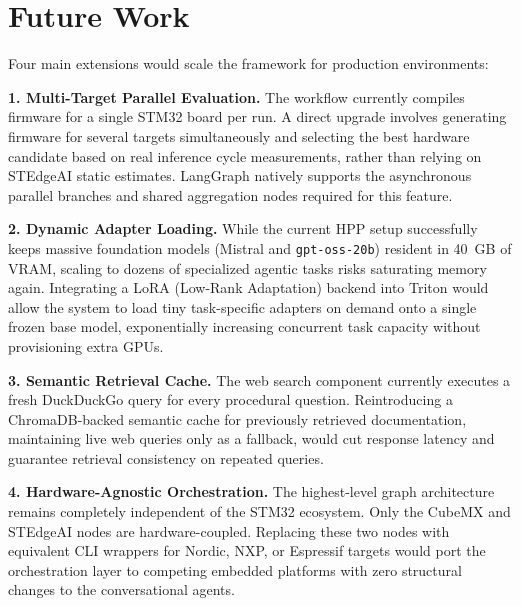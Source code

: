\section{Future Work}

Four main extensions would scale the framework for production environments:

\textbf{1. Multi-Target Parallel Evaluation.} The workflow currently compiles firmware for a single STM32 board per run. A direct upgrade involves generating firmware for several targets simultaneously and selecting the best hardware candidate based on real inference cycle measurements, rather than relying on STEdgeAI static estimates. LangGraph natively supports the asynchronous parallel branches and shared aggregation nodes required for this feature.

\textbf{2. Dynamic Adapter Loading.} While the current HPP setup successfully keeps massive foundation models (Mistral and \texttt{gpt-oss-20b}) resident in 40~GB of VRAM, scaling to dozens of specialized agentic tasks risks saturating memory again. Integrating a LoRA (Low-Rank Adaptation) backend into Triton would allow the system to load tiny task-specific adapters on demand onto a single frozen base model, exponentially increasing concurrent task capacity without provisioning extra GPUs.

\textbf{3. Semantic Retrieval Cache.} The web search component currently executes a fresh DuckDuckGo query for every procedural question. Reintroducing a ChromaDB-backed semantic cache for previously retrieved documentation, maintaining live web queries only as a fallback, would cut response latency and guarantee retrieval consistency on repeated queries.

\textbf{4. Hardware-Agnostic Orchestration.} The highest-level graph architecture remains completely independent of the STM32 ecosystem. Only the CubeMX and STEdgeAI nodes are hardware-coupled. Replacing these two nodes with equivalent CLI wrappers for Nordic, NXP, or Espressif targets would port the orchestration layer to competing embedded platforms with zero structural changes to the conversational agents.
